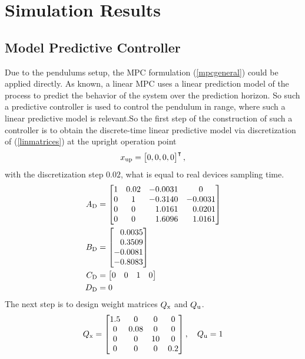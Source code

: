 \chapter{Simulation Results}
\section{Model Predictive Controller}
Due to the pendulums setup, the MPC formulation (\ref{mpcgeneral}) could be applied directly. As known, a linear MPC uses a linear prediction model of the process to predict the behavior of the system over the prediction horizon. So such a predictive controller is used to control the pendulum in range, where such a linear predictive model is relevant.So the first step of the construction of such a controller is to obtain the discrete-time linear predictive model via discretization of (\ref{linmatrices}) at the upright operation point 
\begin{equation}
	x _{\text{up}} = \begin{bmatrix}0,0,0,0\end{bmatrix}^\intercal, 
\end{equation}
with the discretization step $0.02$, what is equal to real devices sampling time. 
\begin{subequations}\label{dismatrices}
	\begin{align}
	A _{\text{D}} &=\begin{bmatrix}
	1&0.02&-0.0031& 0\\
	0&1&-0.3140&-0.0031\\
	0&0&\ \; \,1.0161&\ \; \,0.0201\\
	0&0&\ \; \,1.6096&\ \; \,1.0161
	\end{bmatrix}\\
	B _{\text{D}} &=\begin{bmatrix}
	\ \; \,0.0035\\
	\ \; \,0.3509\\
	-0.0081\\
	-0.8083
	\end{bmatrix}\\
	C _{\text{D}} &= \begin{bmatrix}0&0&1&0\end{bmatrix}\\
	D _{\text{D}} &= 0
	\end{align}
\end{subequations}
The next step is to design weight matrices $Q _{\text{x}}$ and $Q _{\text{u}}$.
\begin{equation}
Q _{\text{x}} = \begin{bmatrix}
1.5&0&0&0\\
0&0.08&0&0\\
0&0&10&0\\
0&0&0&0.2
\end{bmatrix}, \quad Q _{\text{u}} = 1
\end{equation}
